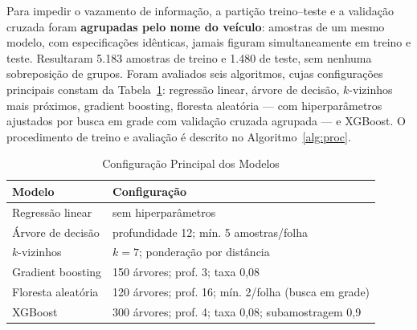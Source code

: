\documentclass[conference]{IEEEtran}
\begin{document}
Para impedir o vazamento de informação, a partição treino--teste e a validação cruzada foram \textbf{agrupadas pelo nome do veículo}: amostras de um mesmo modelo, com especificações idênticas, jamais figuram simultaneamente em treino e teste. Resultaram 5.183 amostras de treino e 1.480 de teste, sem nenhuma sobreposição de grupos. Foram avaliados seis algoritmos, cujas configurações principais constam da Tabela~\ref{tab:config}: regressão linear, árvore de decisão, $k$-vizinhos mais próximos, gradient boosting, floresta aleatória --- com hiperparâmetros ajustados por busca em grade com validação cruzada agrupada --- e XGBoost. O procedimento de treino e avaliação é descrito no Algoritmo~\ref{alg:proc}.

\begin{table}[t]
\caption{Configuração Principal dos Modelos}
\begin{center}
\footnotesize
\begin{tabular}{ll}
\toprule
\textbf{Modelo} & \textbf{Configuração} \\
\midrule
Regressão linear & sem hiperparâmetros \\
Árvore de decisão & profundidade 12; mín. 5 amostras/folha \\
$k$-vizinhos & $k=7$; ponderação por distância \\
Gradient boosting & 150 árvores; prof. 3; taxa 0,08 \\
Floresta aleatória & 120 árvores; prof. 16; mín. 2/folha (busca em grade) \\
XGBoost & 300 árvores; prof. 4; taxa 0,08; subamostragem 0,9 \\
\bottomrule
\end{tabular}
\label{tab:config}
\end{center}
\end{table}
\end{document}
